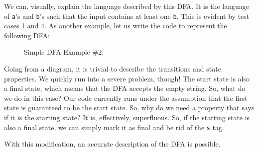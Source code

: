 We can, visually, explain the language described by this DFA. It is the language of \texttt{a}'s and \texttt{b}'s such that the input contains at least one \texttt{b}. This is evident by test cases 1 and 4. As another example, let us write the code to represent the following DFA:

\begin{figure}[H]
\begin{center}
\end{center}
\caption{Simple DFA Example \#2.}
\label{fig:dfanest2}
\end{figure}

Going from a diagram, it is trivial to describe the transitions and state properties. We quickly run into a severe problem, though! The start state is also a final state, which means that the DFA accepts the empty string. So, what do we do in this case? Our code currently runs under the assumption that the first state is guaranteed to be the start state. So, why do we need a property that says if it is the starting state? It is, effectively, superfluous. So, if the starting state is also a final state, we can simply mark it as final and be rid of the \textquotesingle\texttt{s} tag.

With this modification, an accurate description of the DFA is possible.

